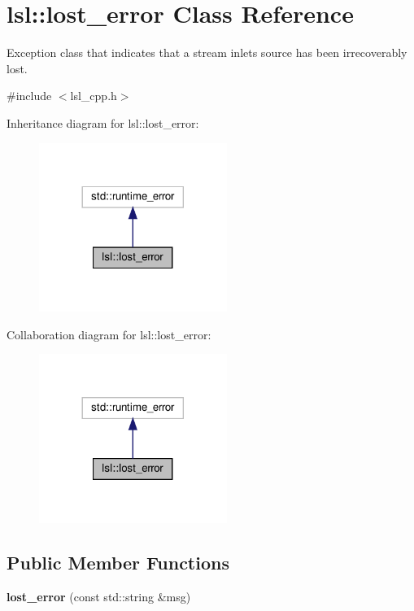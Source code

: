 \hypertarget{classlsl_1_1lost__error}{}\section{lsl\+:\+:lost\+\_\+error Class Reference}
\label{classlsl_1_1lost__error}


Exception class that indicates that a stream inlet\textquotesingle{}s source has been irrecoverably lost.  




{\ttfamily \#include $<$lsl\+\_\+cpp.\+h$>$}



Inheritance diagram for lsl\+:\+:lost\+\_\+error\+:\nopagebreak
\begin{figure}[H]
\begin{center}
\leavevmode
\includegraphics[width=173pt]{d5/d0b/classlsl_1_1lost__error__inherit__graph}
\end{center}
\end{figure}


Collaboration diagram for lsl\+:\+:lost\+\_\+error\+:\nopagebreak
\begin{figure}[H]
\begin{center}
\leavevmode
\includegraphics[width=173pt]{d7/d36/classlsl_1_1lost__error__coll__graph}
\end{center}
\end{figure}
\subsection*{Public Member Functions}
\begin{DoxyCompactItemize}
\item 
\mbox{\label{classlsl_1_1lost__error_a997ff6ff1ecd4fd33cda631b975d386e}} 
{\bfseries lost\+\_\+error} (const std\+::string \&msg)
\end{DoxyCompactItemize}


